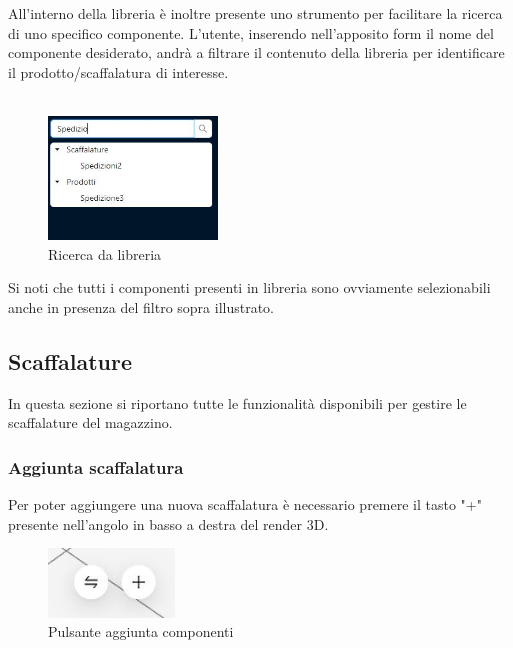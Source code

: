                 \noindent All'interno della libreria è inoltre presente uno strumento per facilitare la ricerca di uno specifico componente. L'utente, inserendo nell'apposito
                form il nome del componente desiderato, andrà a filtrare il contenuto della libreria per identificare il prodotto/scaffalatura di interesse. \\\
                \begin{figure}[h!]
                    \centering
                    \includegraphics[width=0.4\textwidth]{images/filtro_ricerca.png}
                    \caption{Ricerca da libreria}
                \end{figure}
                
                \noindent Si noti che tutti i componenti presenti in libreria sono ovviamente selezionabili anche in presenza del filtro sopra illustrato.    

    \newpage
    \subsection{Scaffalature}\label{sec:scaffalature}
    In questa sezione si riportano tutte le funzionalità disponibili per gestire le scaffalature del magazzino.
        \subsubsection{Aggiunta scaffalatura}\label{sec:scaffalature:aggiunta}
            Per poter aggiungere una nuova scaffalatura è necessario premere il tasto "+" presente nell'angolo in basso a destra del render 3D.\\
            \begin{figure}[h!]
                \centering
                \includegraphics[width=0.3\textwidth]{images/aggiunta_spostamenti.png}
                \caption{Pulsante aggiunta componenti}
            \end{figure}

